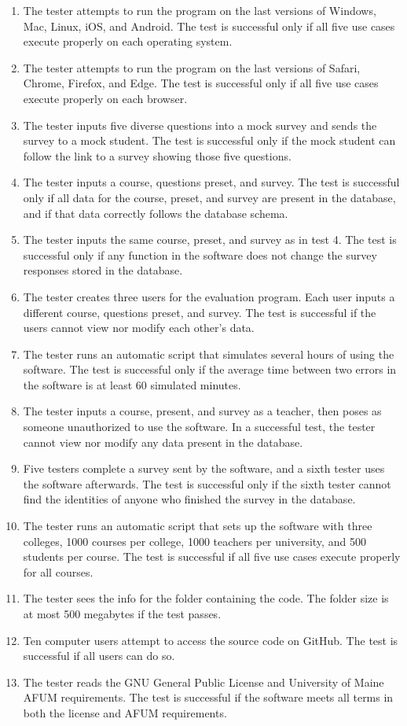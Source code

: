 \documentclass{article}
\begin{document}
\begin{enumerate}
  \item The tester attempts to run the program on the last versions of Windows, Mac, Linux, iOS, and Android. The test is successful only if all five use cases execute properly on each operating system.
  \item The tester attempts to run the program on the last versions of Safari, Chrome, Firefox, and Edge. The test is successful only if all five use cases execute properly on each browser.
  \item The tester inputs five diverse questions into a mock survey and sends the survey to a mock student. The test is successful only if the mock student can follow the link to a survey showing those five questions.
  \item The tester inputs a course, questions preset, and survey. The test is successful only if all data for the course, preset, and survey are present in the database, and if that data correctly follows the database schema.
  \item The tester inputs the same course, preset, and survey as in test 4. The test is successful only if any function in the software does not change the survey responses stored in the database.
  \item The tester creates three users for the evaluation program. Each user inputs a different course, questions preset, and survey. The test is successful if the users cannot view nor modify each other's data.
  \item The tester runs an automatic script that simulates several hours of using the software. The test is successful only if the average time between two errors in the software is at least 60 simulated minutes.
  \item The tester inputs a course, present, and survey as a teacher, then poses as someone unauthorized to use the software. In a successful test, the tester cannot view nor modify any data present in the database.
  \item Five testers complete a survey sent by the software, and a sixth tester uses the software afterwards. The test is successful only if the sixth tester cannot find the identities of anyone who finished the survey in the database.
  \item The tester runs an automatic script that sets up the software with three colleges, 1000 courses per college, 1000 teachers per university, and 500 students per course. The test is successful if all five use cases execute properly for all courses.
  \item The tester sees the info for the folder containing the code. The folder size is at most 500 megabytes if the test passes.
  \item Ten computer users attempt to access the source code on GitHub. The test is successful if all users can do so.
  \item The tester reads the GNU General Public License and University of Maine AFUM requirements. The test is successful if the software meets all terms in both the license and AFUM requirements.
\end{enumerate}
\end{document}
